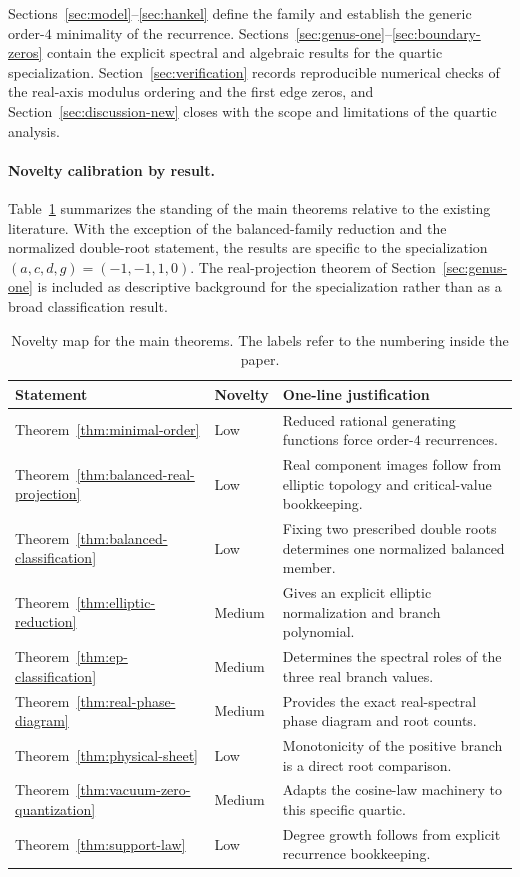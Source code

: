 Sections~\ref{sec:model}--\ref{sec:hankel} define the family and establish the generic order-$4$ minimality of the recurrence.
Sections~\ref{sec:genus-one}--\ref{sec:boundary-zeros} contain the explicit spectral and algebraic results for the quartic specialization.
Section~\ref{sec:verification} records reproducible numerical checks of the real-axis modulus ordering and the first edge zeros, and Section~\ref{sec:discussion-new} closes with the scope and limitations of the quartic analysis.

\paragraph{Novelty calibration by result.}
Table~\ref{tab:novelty-map} summarizes the standing of the main theorems relative to the existing literature.
With the exception of the balanced-family reduction and the normalized double-root statement, the results are specific to the specialization \((a,c,d,g)=(-1,-1,1,0)\).
The real-projection theorem of Section~\ref{sec:genus-one} is included as descriptive background for the specialization rather than as a broad classification result.

\begin{table}[t]
\centering
\small
\begin{tabular}{lll}
\toprule
Statement & Novelty & One-line justification \\
\midrule
Theorem~\ref{thm:minimal-order} & Low & Reduced rational generating functions force order-$4$ recurrences. \\
Theorem~\ref{thm:balanced-real-projection} & Low & Real component images follow from elliptic topology and critical-value bookkeeping. \\
Theorem~\ref{thm:balanced-classification} & Low & Fixing two prescribed double roots determines one normalized balanced member. \\
Theorem~\ref{thm:elliptic-reduction} & Medium & Gives an explicit elliptic normalization and branch polynomial. \\
Theorem~\ref{thm:ep-classification} & Medium & Determines the spectral roles of the three real branch values. \\
Theorem~\ref{thm:real-phase-diagram} & Medium & Provides the exact real-spectral phase diagram and root counts. \\
Theorem~\ref{thm:physical-sheet} & Low & Monotonicity of the positive branch is a direct root comparison. \\
Theorem~\ref{thm:vacuum-zero-quantization} & Medium & Adapts the cosine-law machinery to this specific quartic. \\
Theorem~\ref{thm:support-law} & Low & Degree growth follows from explicit recurrence bookkeeping. \\
\bottomrule
\end{tabular}
\caption{Novelty map for the main theorems. The labels refer to the numbering inside the paper.}
\label{tab:novelty-map}
\end{table}
